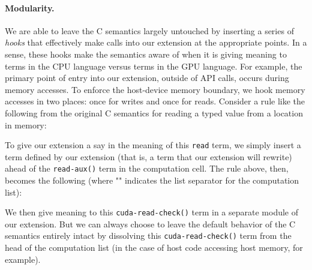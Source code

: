 \paragraph{Modularity.} 
We are able to leave the C semantics largely untouched by inserting a series of
{\em hooks} that effectively make calls into our extension at the appropriate
points. In a sense, these hooks make the semantics aware of when it is giving
meaning to terms in the CPU language versus terms in the GPU language. For
example, the primary point of entry into our extension, outside of API calls,
occurs during memory accesses. To enforce the host-device memory boundary, we
hook memory accesses in two places: once for writes and once for reads. Consider
a rule like the following from the original C semantics for reading a typed
value from a location in memory:

\vspace{0.5em}
{\footnotesize
{}
}

\noindent To give our extension a say in the meaning of this {\tt read} term, we simply
insert a term defined by our extension (that is, a term that our extension will
rewrite) ahead of the {\tt read-aux()} term in the computation cell. 
The rule above, then, becomes the following (where ""
indicates the list separator for the computation list):

\vspace{0.5em}
{\footnotesize
{}
}

We then give meaning to this {\tt cuda-read-check()} term in a separate module
of our extension. But we can always choose to leave the default behavior of the
C semantics entirely intact by dissolving this {\tt cuda-read-check()} term from
the head of the computation list (in the case of host code accessing host
memory, for example). 

